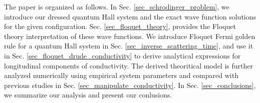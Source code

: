 The paper is organized as follows. In Sec.  \ref{sec_schrodinger_problem}, we introduce our dressed quantum Hall system and the exact wave function solutions for the given configuration. Sec. \ref{sec_floquet_theory}, provides the Floquet theory interpretation of these wave functions.
We introduce Floquet Fermi golden rule for a quantum Hall system in Sec. \ref{sec_inverse_scattering_time}, and use it in Sec. \ref{sec_floquet_drude_conductivity} to derive analytical expressions for longitudinal components of conductivity.
The derived theoritical model is further analyzed numerically using empirical system parameters and compared with previous studies in Sec. \ref{sec_manipulate_conductivity}.
In Sec. \ref{sec_conclusions}, we summarize our analysis and present our conlusions.

